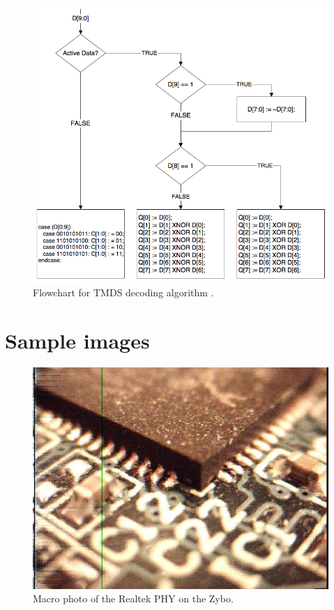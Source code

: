 \begin{appendices}
\begin{figure}
  \centering
  \includegraphics[width=1\textwidth]{./img/tmds_decode.png}
  \caption{Flowchart for TMDS decoding algorithm \cite{dvi_spec}.}
  \label{fig:tmds_decoding_algorithm}
\end{figure}

\chapter{Sample images}
\begin{figure}
  \centering
  \includegraphics[width=1\textwidth]{./img/ov7670_pcb.jpg}
  \caption{Macro photo of the Realtek PHY on the Zybo.}
  \label{fig:ov7670_pcb}
\end{figure}


\end{appendices}
